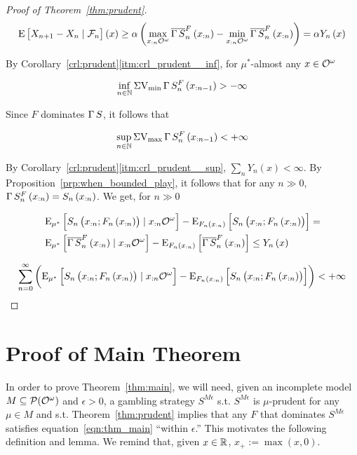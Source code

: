 \begin{proof}[Proof of Theorem~\ref{thm:prudent}]
$$\operatorname{E}\left[X_{n+1} - X_n \mid \mathcal{F}_n\right]\left(x\right) \geq \alpha \left(\max_{x_{:n}\mathcal{O}^\omega} \overline{\operatorname{\Gamma}{S}}_{n}^F\left(x_{:n}\right) - \min_{x_{:n}\mathcal{O}^\omega} \overline{\operatorname{\Gamma}{S}}_{n}^F\left(x_{:n}\right)\right) = \alpha Y_n\left(x\right)$$

By Corollary~\ref*{crl:prudent}\ref{itm:crl_prudent__inf}, for $\mu^*$-almost any $x \in \mathcal{O}^\omega$

\[\inf_{n \in \mathbb{N}} \operatorname{\Sigma V_{\min}} \operatorname{\Gamma}{S}^F_{n}\left(x_{:n-1}\right) > -\infty\]

Since $F$ dominates $\operatorname{\Gamma}{S}$, it follows that

\[\sup_{n \in \mathbb{N}} \operatorname{\Sigma V_{\max}} \operatorname{\Gamma}{S}^F_{n}\left(x_{:n-1}\right) < +\infty\] 

By Corollary~\ref*{crl:prudent}\ref{itm:crl_prudent__sup}, $\sum_n Y_n\left(x\right) < \infty$. By Proposition~\ref{prp:when_bounded_play}, it follows that for any $n \gg 0$, $\operatorname{\Gamma}{S}^F_n\left(x_{:n}\right) = S_n\left(x_{:n}\right)$. We get, for $n \gg 0$

\begin{align*}
&\operatorname{E}_{\mu^*}\left[S_n\left(x_{:n};F_n\left(x_{:n}\right)\right) \mid x_{:n}\mathcal{O}^\omega\right]-\operatorname{E}_{F_n\left(x_{:n}\right)}\left[S_n\left(x_{:n};F_n\left(x_{:n}\right)\right)\right] = \\ 
&\operatorname{E}_{\mu^*}\left[\overline{\operatorname{\Gamma}{S}}^F_n\left(x_{:n}\right) \mid x_{:n}\mathcal{O}^\omega\right]-\operatorname{E}_{F_n\left(x_{:n}\right)}\left[\overline{\operatorname{\Gamma}{S}}^F_n\left(x_{:n}\right)\right] \leq Y_n\left(x\right)
\end{align*}

$$\sum_{n=0}^\infty \left(\operatorname{E}_{\mu^*}\left[S_n\left(x_{:n};F_n\left(x_{:n}\right)\right) \mid x_{:n}\mathcal{O}^\omega\right]-\operatorname{E}_{F_n\left(x_{:n}\right)}\left[S_n\left(x_{:n};F_n\left(x_{:n}\right)\right)\right]\right) < +\infty$$
\end{proof}

\section{Proof of Main Theorem}
\label{sec:construction}

In order to prove Theorem~\ref{thm:main}, we will need, given an incomplete model $M \subseteq \mathcal{P}(\mathcal{O}^\omega)$ and $\epsilon > 0$, a gambling strategy $S^{M\epsilon}$ s.t. $S^{M\epsilon}$ is $\mu$-prudent for any $\mu \in M$ and s.t. Theorem~\ref{thm:prudent} implies that any $F$ that dominates $S^{M\epsilon}$ satisfies equation~\ref{eqn:thm_main} \enquote{within $\epsilon$.} This motivates the following definition and lemma. We remind that, given $x \in \mathbb{R}$, $x_+:=\max(x,0)$.

